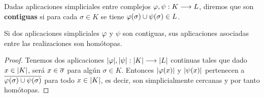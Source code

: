 \begin{definition}
  Dadas aplicaciones simpliciales entre complejos  $\varphi,\psi :K\longrightarrow L$, diremos que son \textbf{contiguas} si para cada $ \sigma\in K $ se tiene $ \varphi(\sigma)\cup \psi(\sigma)\in L $.
\end{definition}

\begin{proposition}\label{contiguashomotopas}
  Si dos aplicaciones simpliciales $ \varphi  $ y $ \psi  $ son contiguas, sus aplicaciones asociadas entre las realizaciones son homótopas. 
\end{proposition}
\begin{proof}
  Tenemos dos aplicaciones $ \abs{\varphi},\abs{\psi}:\abs{K}\longrightarrow\abs{L} $ continuas tales que dado $ x\in \abs{K} $, será $ x\in \overline{\sigma } $ para algún $ \sigma\in K $. Entonces $ \abs{\varphi(x)}$ y $ \abs{\psi(x)}$ pertenecen a $ \overline{\varphi(\sigma)\cup\psi(\sigma ) }$ para todo $ x\in \abs{K}$, es decir, son simplicialmente cercanas y por tanto homótopas.
\end{proof}
\iffalse
\begin{definition}
  Un \textbf{cono simplicial} es un complejo $ K $ que tiene un vértice $ a $ tal que para todo $ \sigma\in K $, $ \sigma\cup \{a\} $ también es símplice de $ K $.
\end{definition}
\begin{proposition}\label{conosimp}
  Si $ K $ es un cono simplicial, $ \abs{K} $ es contráctil.
\end{proposition}
\begin{proof}
  Basta usar la proposición anterior: la identidad es contigua a la aplicación que envía cada vértice a $ a $.
\end{proof}
\fi